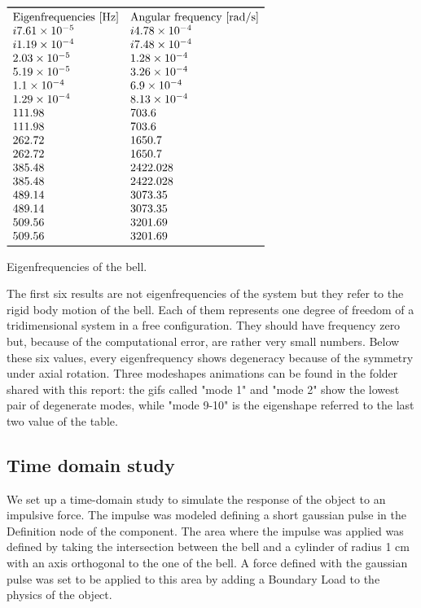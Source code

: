 \documentclass[a4paper]{article}
\begin{document}
\begin{table}[h]
	\centering
	$\begin{array}{ll}
		\toprule
		\text{Eigenfrequencies [Hz]} & \text{Angular frequency [rad/s]}\\
				i7.61\times 10^{-5} & i4.78\times 10^{-4} \\
		i1.19\times 10^{-4} &  i7.48\times 10^{-4} \\
		2.03\times 10^{-5} & 1.28\times 10^{-4} \\
		5.19\times 10^{-5} & 3.26\times 10^{-4} \\
		1.1\times 10^{-4} & 6.9\times 10^{-4} \\
		1.29\times 10^{-4} & 8.13\times 10^{-4}  \\
		111.98  &  703.6 \\
		111.98  &  703.6 \\
		262.72 &   1650.7\\ 
		262.72 &   1650.7\\  
		385.48 &   2422.028 \\   
		385.48 &   2422.028 \\ 
		489.14 &  3073.35 \\
     	489.14 &  3073.35 \\
     	509.56  &  3201.69 \\
     	509.56  &  3201.69 \\
		\bottomrule
	\end{array}$
	\caption{Eigenfrequencies of the bell.}
	\label{tab:freq}
\end{table}

The first six results are not eigenfrequencies of the system but they refer to the rigid body motion of the bell. Each of them represents one degree of freedom of a tridimensional system in a free configuration. They should have frequency zero but, because of the computational error, are rather very small numbers. Below these six values, every eigenfrequency shows degeneracy because of the symmetry under axial rotation. Three modeshapes animations can be found in the folder shared with this report: the gifs called "mode 1" and "mode 2" show the lowest pair of degenerate modes, while "mode 9-10" is the eigenshape referred to the last two value of the table. 


\subsection{Time domain study}
We set up a time-domain study to simulate the response of the object to an impulsive force. The impulse was modeled defining a short gaussian pulse in the Definition node of the component. The area where the impulse was applied was defined by taking the intersection between the bell and a cylinder of radius 1 cm with an axis orthogonal to the one of the bell. A force defined with the gaussian pulse was set to be applied to this area by adding a Boundary Load to the physics of the object.
\end{document}
